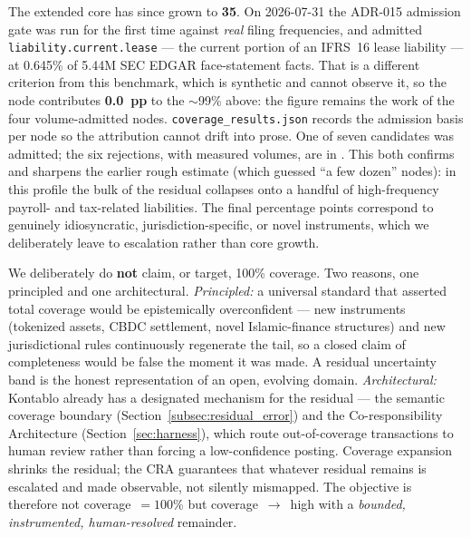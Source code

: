 The extended core has since grown to \textbf{35}. On 2026-07-31 the ADR-015
admission gate was run for the first time against \emph{real} filing
frequencies, and admitted \texttt{liability.current.lease} --- the current
portion of an IFRS~16 lease liability --- at 0.645\% of 5.44M SEC EDGAR
face-statement facts. That is a different criterion from this benchmark, which
is synthetic and cannot observe it, so the node contributes \textbf{0.0~pp} to
the $\sim$99\% above: the figure remains the work of the four volume-admitted
nodes. \texttt{coverage\_results.json} records the admission basis per node so
the attribution cannot drift into prose. One of seven candidates was admitted;
the six rejections, with measured volumes, are in
. This both
confirms and sharpens the earlier rough estimate (which guessed ``a few dozen''
nodes): in this profile the bulk of the residual collapses onto a handful of
high-frequency payroll- and tax-related liabilities. The final percentage points
correspond to genuinely idiosyncratic, jurisdiction-specific, or novel
instruments, which we deliberately leave to escalation rather than core growth.

We deliberately do \textbf{not} claim, or target, 100\% coverage. Two reasons,
one principled and one architectural. \emph{Principled:} a universal standard
that asserted total coverage would be epistemically overconfident --- new
instruments (tokenized assets, CBDC settlement, novel Islamic-finance
structures) and new jurisdictional rules continuously regenerate the tail, so a
closed claim of completeness would be false the moment it was made. A residual
uncertainty band is the honest representation of an open, evolving domain.
\emph{Architectural:} Kontablo already has a designated mechanism for the
residual --- the semantic coverage boundary (Section~\ref{subsec:residual_error})
and the Co-responsibility Architecture (Section~\ref{sec:harness}), which route
out-of-coverage transactions to human review rather than forcing a
low-confidence posting. Coverage expansion shrinks the residual; the CRA
guarantees that whatever residual remains is escalated and made observable, not
silently mismapped. The objective is therefore not coverage~$=100\%$ but
coverage~$\to$~high with a \emph{bounded, instrumented, human-resolved}
remainder.

